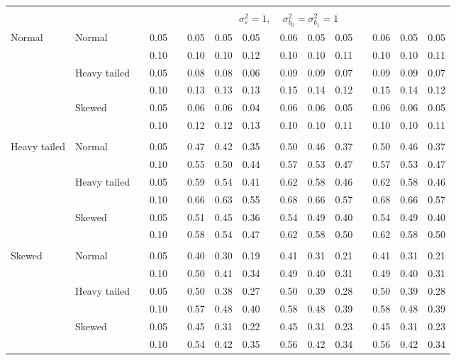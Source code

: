 \documentclass{article} %
\begin{document}
\begin{table}[ht]
\begin{scriptsize}
\begin{center}
\begin{tabular}{ll p{.1cm} c p{.1cm} rrr p{.1cm} rrr p{.1cm} rrr}
&&&&&&&&&&&&&&&\\
& && && \multicolumn{9}{c}{$\sigma_{\varepsilon}^2 = 1$, \ \ $\sigma_{b_0}^2 = \sigma_{b_1}^2 = 1$} \\ \cline{6-16}
\rowcolor{gray!20}Normal       & Normal       && 0.05 &&   0.05 & 0.05 & 0.05 && 0.06 & 0.05 & 0.05 && 0.06 & 0.05 & 0.05 \\ 
\rowcolor{gray!20}             &              && 0.10 &&   0.10 & 0.10 & 0.12 && 0.10 & 0.10 & 0.11 && 0.10 & 0.10 & 0.11 \\ 
\rowcolor{gray!20}             & Heavy tailed && 0.05 &&   0.08 & 0.08 & 0.06 && 0.09 & 0.09 & 0.07 && 0.09 & 0.09 & 0.07 \\ 
\rowcolor{gray!20}             &              && 0.10 &&   0.13 & 0.13 & 0.13 && 0.15 & 0.14 & 0.12 && 0.15 & 0.14 & 0.12 \\ 
\rowcolor{gray!20}             & Skewed       && 0.05 &&   0.06 & 0.06 & 0.04 && 0.06 & 0.06 & 0.05 && 0.06 & 0.06 & 0.05 \\ 
\rowcolor{gray!20}             &              && 0.10 &&   0.12 & 0.12 & 0.13 && 0.10 & 0.10 & 0.11 && 0.10 & 0.10 & 0.11 \\ 
             &&&&&&&&&&&&&&&\\
Heavy tailed & Normal       && 0.05 &&   0.47 & 0.42 & 0.35 && 0.50 & 0.46 & 0.37 && 0.50 & 0.46 & 0.37 \\ 
             &              && 0.10 &&   0.55 & 0.50 & 0.44 && 0.57 & 0.53 & 0.47 && 0.57 & 0.53 & 0.47 \\ 
             & Heavy tailed && 0.05 &&   0.59 & 0.54 & 0.41 && 0.62 & 0.58 & 0.46 && 0.62 & 0.58 & 0.46 \\ 
             &              && 0.10 &&   0.66 & 0.63 & 0.55 && 0.68 & 0.66 & 0.57 && 0.68 & 0.66 & 0.57 \\ 
             & Skewed       && 0.05 &&   0.51 & 0.45 & 0.36 && 0.54 & 0.49 & 0.40 && 0.54 & 0.49 & 0.40 \\ 
             &              && 0.10 &&   0.58 & 0.54 & 0.47 && 0.62 & 0.58 & 0.50 && 0.62 & 0.58 & 0.50 \\ 
             &&&&&&&&&&&&&&&\\
Skewed       & Normal       && 0.05 &&   0.40 & 0.30 & 0.19 && 0.41 & 0.31 & 0.21 && 0.41 & 0.31 & 0.21 \\ 
             &              && 0.10 &&   0.50 & 0.41 & 0.34 && 0.49 & 0.40 & 0.31 && 0.49 & 0.40 & 0.31 \\ 
             & Heavy tailed && 0.05 &&   0.50 & 0.38 & 0.27 && 0.50 & 0.39 & 0.28 && 0.50 & 0.39 & 0.28 \\ 
             &              && 0.10 &&   0.57 & 0.48 & 0.40 && 0.58 & 0.48 & 0.39 && 0.58 & 0.48 & 0.39 \\ 
             & Skewed       && 0.05 &&   0.45 & 0.31 & 0.22 && 0.45 & 0.31 & 0.23 && 0.45 & 0.31 & 0.23 \\ 
             &              && 0.10 &&   0.54 & 0.42 & 0.35 && 0.56 & 0.42 & 0.34 && 0.56 & 0.42 & 0.34 \\ 




\end{tabular}
\end{center}
\end{scriptsize}
\end{table}
\end{document}
